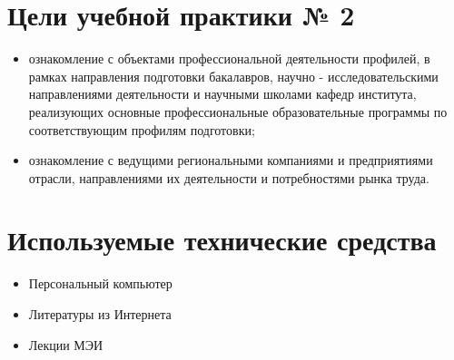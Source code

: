 \section{Цели учебной практики № 2}
\begin{itemize}[label={--},noitemsep,nolistsep]
	\item ознакомление с объектами профессиональной деятельности профилей, в рамках направления подготовки бакалавров, научно - исследовательскими направлениями деятельности и научными школами кафедр института, реализующих основные профессиональные образовательные программы по соответствующим профилям подготовки;
	\item ознакомление с ведущими региональными компаниями и предприятиями отрасли, направлениями их деятельности и потребностями рынка труда. 
\end{itemize}

\section{Используемые технические средства}
\begin{itemize}[label={--},noitemsep,nolistsep]
	\item Персональный компьютер
	\item Литературы из Интернета
	\item Лекции МЭИ
\end{itemize}
